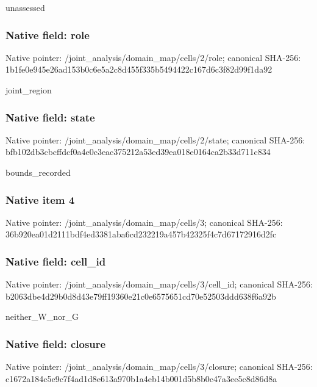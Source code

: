 \documentclass[10pt,a4paper]{article}
\begin{document}
\begingroup\raggedright\sloppy unassessed\par\endgroup

\subsubsection{Native field: role}
Native pointer: /joint\_\allowbreak{}analysis/domain\_\allowbreak{}map/cells/2/role; canonical SHA-256: 1b1fe0e945e26ad153b0c6e5a2c8d455f335b5494422c167d6c3f82d99f1da92

\begingroup\raggedright\sloppy joint\_\allowbreak{}region\par\endgroup

\subsubsection{Native field: state}
Native pointer: /joint\_\allowbreak{}analysis/domain\_\allowbreak{}map/cells/2/state; canonical SHA-256: bfb102db3cbcffdcf0a4e0c3eac375212a53ed39ea018e0164ca2b33d711c834

\begingroup\raggedright\sloppy bounds\_\allowbreak{}recorded\par\endgroup

\subsubsection{Native item 4}
Native pointer: /joint\_\allowbreak{}analysis/domain\_\allowbreak{}map/cells/3; canonical SHA-256: 36b920ea01d2111bdf4ed3381aba6cd232219a457b42325f4c7d67172916d2fc

\subsubsection{Native field: cell\_\allowbreak{}id}
Native pointer: /joint\_\allowbreak{}analysis/domain\_\allowbreak{}map/cells/3/cell\_\allowbreak{}id; canonical SHA-256: b2063dbe4d29b0d8d43e79ff19360e21c0e6575651cd70e52503ddd638f6a92b

\begingroup\raggedright\sloppy neither\_\allowbreak{}W\_\allowbreak{}nor\_\allowbreak{}G\par\endgroup

\subsubsection{Native field: closure}
Native pointer: /joint\_\allowbreak{}analysis/domain\_\allowbreak{}map/cells/3/closure; canonical SHA-256: c1672a184c5e9c7f4ad1d8e613a970b1a4eb14b001d5b8b0c47a3ee5c8d86d8a
\end{document}
